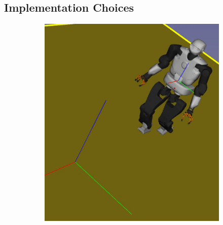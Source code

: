 \subsection{Implementation Choices}
\begin{figure}[h]
    \centering
    \begin{subfigure}[t]{0.19\linewidth}
        \includegraphics[width=\textwidth,trim={3cm 3cm 0 0}, clip] {Figures/Chapter_CPSB/sidewalk_seq/frame_0.png}
    \end{subfigure}
    \begin{subfigure}[t]{0.19\linewidth}

\end{subfigure}
\end{figure}
